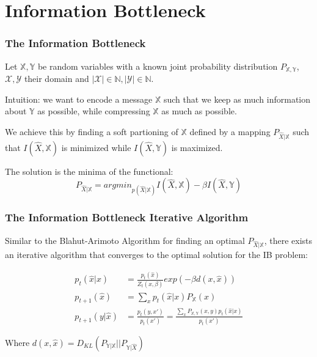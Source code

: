 \section[IB]{Information Bottleneck} 



\begin{frame}
    \frametitle{The Information Bottleneck}
    Let $\mathbb{X}, \mathbb{Y}$ be random variables with a known joint probability distribution $P_{\mathbb{X}, \mathbb{Y}}$, $\mathcal{X}, \mathcal{Y}$ their domain and  $|\mathcal{X}| \in \mathbb{N}, |\mathcal{Y}| \in \mathbb{N}$. \newline

    Intuition: we want to encode a message $\mathbb{X}$ such that we keep as much information about $\mathbb{Y}$ as possible, while compressing $\mathbb{X}$ as much as possible. \newline

    We achieve this by finding a soft partioning of $\mathbb{X}$ defined by a mapping $P_{\hat{X}|\mathbb{X}}$ such that $I(\hat{X},\mathbb{X})$ is minimized while $I(\hat{X},\mathbb{Y})$ is maximized. \newline

    The solution is the minima of the functional:
    \begin{equation}
        P_{\hat{X}|\mathbb{X}} = argmin_{p(\hat{X}|\mathbb{X})} 
        I(\hat{X},\mathbb{X}) - \beta I(\hat{X}, \mathbb{Y})
    \end{equation}


    
\end{frame}


\begin{frame}
    \frametitle{The Information Bottleneck Iterative Algorithm}
    Similar to the Blahut-Arimoto Algorithm for finding an optimal $P_{\hat{X}|\mathbb{X}}$, there exists an iterative algorithm that converges to the optimal solution for the IB problem:

    \begin{align*}
        p_t(\hat{x}|x) &= \frac{p_t(\hat{x})}{Z_t(x, \beta)} exp(- \beta d(x, \hat{x}) ) \\
        p_{t+1}(\hat{x}) &= \sum_{x} p_t(\hat{x}|x) P_{\mathbb{X}}(x) \\
        p_{t+1}(y|\hat{x}) &= \frac{p_t(y, x')}{p_t(x')} = \frac{\sum_{x} P_{\mathbb{X},\mathbb{Y}}(x, y) p_t(\hat{x}|x)}{p_t(x')}
    \end{align*}

    Where $d(x, \hat{x}) = D_{KL}(P_{\mathbb{Y}|\mathbb{X}}|| P_{\mathbb{Y}|\hat{X}})$
    
\end{frame}
